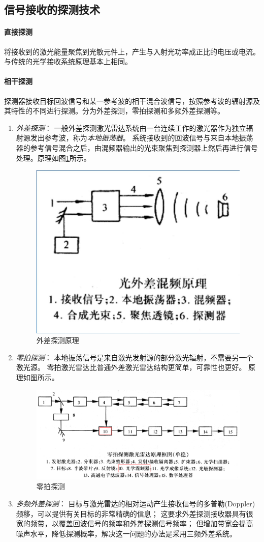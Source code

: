 \subsection{信号接收的探测技术} %
\paragraph{直接探测}将接收到的激光能量聚焦到光敏元件上，产生与入射光功率成正比的电压或电流。与传统的光学接收系统原理基本上相同。
\paragraph{相干探测}探测器接收目标回波信号和某一参考波的相干混合波信号，按照参考波的辐射源及其特性的不同进行探测。分为外差探测，零拍探测和多频外差探测等。
\begin{enumerate}
	\item \textit{外差探测}：
		一般外差探测激光雷达系统由一台连续工作的激光器作为独立辐射源发出参考波，称为\textit{本地振荡器}。
		系统接收到的回波信号与来自本地振荡器的参考信号混合之后，由混频器输出的光束聚焦到探测器上然后再进行信号处理。原理如图\ref{fig:外差探测}所示。
		\begin{figure}[htbp]
			\centering
			\includegraphics[width=0.5\linewidth]{figure/Chapter2/外差探测}
			\caption{外差探测原理}
			\label{fig:外差探测}
		\end{figure}
	\item \textit{零拍探测}：
		本地振荡信号是来自激光发射源的部分激光辐射，不需要另一个激光源。
		零拍激光雷达比普通外差激光雷达结构更简单，可靠性也更好。
		原理如图所示。
		\begin{figure}[htbp]
			\centering
			\includegraphics[width=0.7\linewidth]{figure/Chapter2/零拍探测}
			\caption{零拍探测}
			\label{fig:零拍探测}
		\end{figure}
	\item \textit{多频外差探测}：
		目标与激光雷达的相对运动产生接收信号的多普勒(Doppler)频移，可以提供有关目标的非常精确的信息；
		这要求外差探测接收器具有很宽的频带，以覆盖回波信号的频率和外差探测信号频率；
		但增加带宽会提高噪声水平，降低探测概率，解决这一问题的办法是采用三频外差系统。
		

\end{enumerate}
